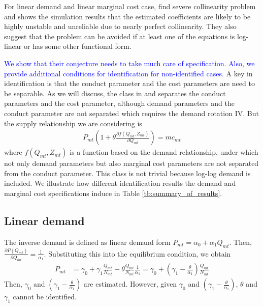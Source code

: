 \documentclass[11pt]{article}
\begin{document}
For linear demand and linear marginal cost case, \cite{perloff2012collinearity} find severe collinearity problem and shows the simulation results that the estimated coefficients are likely to be highly unstable and unreliable due to nearly perfect collinearity. They also suggest that the problem can be avoided if
at least one of the equations is log-linear or has some other functional form.

\textcolor{blue}{We show that their conjecture needs to take much care of specification. Also, we provide additional conditions for identification for non-identified cases.}
A key in identification is that the conduct parameter and the cost parameters are need to be separable.
As we will discuss, the class in \citet{bresnahan1982oligopoly} and \citet{lau1982identifying} separates the conduct parameters and the cost parameter, although demand parameters and the conduct parameter are not separated which requires the demand rotation IV.
But the supply relationship we are considering is
\begin{align*}
    P_{mt} \left( 1 + \theta\frac{\partial f(Q_{mt}, Z_{mt})}{\partial Q_{mt}}\right) = mc_{mt}
\end{align*}
where $f(Q_{mt},Z_{mt})$ is a function based on the demand relationship, under which not only demand parameters but also marginal cost parameters are not separated from the conduct parameter.
This class is not trivial because log-log demand is included.
We illustrate how different identification results the demand and marginal cost specifications induce in Table \ref{tb:summary_of_results}. 

\subsection{Linear demand}
The inverse demand is defined as linear demand form $P_{mt}=\alpha_0+\alpha_1 Q_{mt}$. Then, $\frac{\partial P\left(Q_{m t}\right)}{\partial Q_{mt}}=\frac{1}{\alpha_1}$. Substituting this into the equilibrium condition, we obtain
\begin{align*}
    P_{m t}&=\gamma_0+\gamma_1 \frac{Q_{mt}}{N_{mt}}-\theta \frac{Q_{mt}}{N_{mt}}\frac{1}{\alpha_1}=\gamma_0+(\gamma_1-\frac{\theta}{\alpha_1}) \frac{Q_{mt}}{N_{mt}}
\end{align*}
Then, $\gamma_0$ and $(\gamma_1-\frac{\theta}{\alpha_1})$ are estimated. However, given $\gamma_0$ and $(\gamma_1-\frac{\theta}{\alpha_1})$, $\theta$ and $\gamma_1$ cannot be identified.
\end{document}
